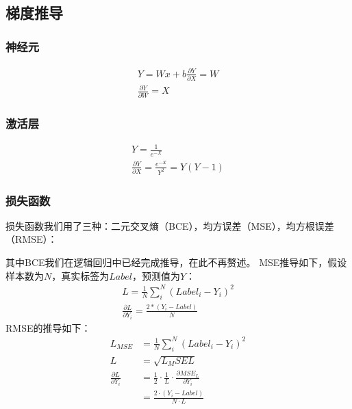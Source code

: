 \documentclass{ctexart}
\begin{document}
                \subsection{梯度推导}
                    \subsubsection{神经元}
                        \begin{eqnarray}
                            Y = Wx + b
                            \frac{\partial{Y}}{\partial{X}} = W \\
                            \frac{\partial{Y}}{\partial{W}} = X
                        \end{eqnarray}
                        
                    \subsubsection{激活层}
                        \begin{eqnarray}
                            Y = \frac{1}{e^{-X}} \\ 
                            \frac{\partial{Y}}{\partial{X}} = \frac{e^{-X}}{Y^2} =  Y(Y-1)
                        \end{eqnarray}
                    
                    \subsubsection{损失函数}
                    损失函数我们用了三种：二元交叉熵（BCE），均方误差（MSE），均方根误差（RMSE）：
                    
                    其中BCE我们在逻辑回归中已经完成推导，在此不再赘述。
                    MSE推导如下，假设样本数为$N$，真实标签为$Label$，预测值为$Y$：
                    \begin{eqnarray}
                        L = \frac{1}{N}\sum_{i}^{N} (Label_i-Y_i)^2 \\ 
                        \frac{\partial L}{\partial Y_i} = \frac{2*(Y_i-Label)}{N}
                    \end{eqnarray}
                    RMSE的推导如下：
                    \centering
                    \begin{eqnarray}
                        L_{MSE} & = \frac{1}{N}\sum_{i}^{N} (Label_i-Y_i)^2 \\ 
                        L & = \sqrt{L_MSEL} \\ 
                        \frac{\partial L}{\partial Y_i} & = \frac{1}{2}\cdot \frac{1}{L} \cdot \frac{\partial MSE_L}{\partial Y_i}\\
                        & = \frac{2\cdot (Y_i-Label)}{N\cdot L}
                    \end{eqnarray}
\end{document}
